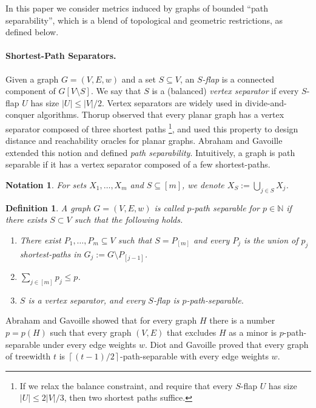 \documentclass[11pt,fleqn]{article}
\newtheorem{definition}[theorem]{Definition}
\newtheorem{notation}[theorem]{Notation}
\providecommand{\eqdef}{:=}
\begin{document}
In this paper we consider metrics induced by graphs of bounded ``path separability'', which is a blend of topological and geometric restrictions,
as defined below.

\paragraph{Shortest-Path Separators.} 
Given a graph $G = (V,E,w)$ and a set $S \subseteq V$, an {\em $S$-flap} is a connected component of $G[V \setminus S]$. We say that $S$ is a (balanced) {\em vertex separator} if every $S$-flap $U$ has size $|U| \le |V|/2$. Vertex separators are widely used in divide-and-conquer algorithms. Thorup \cite{T04} observed that every planar graph has a vertex separator composed of three shortest paths \footnote{If we relax the balance constraint, and require that every $S$-flap $U$ has size $|U| \le 2|V|/3$, then two shortest paths suffice.}, and used this property to design distance and reachability oracles for planar graphs.
Abraham and Gavoille \cite{AG06} extended this notion and defined {\em path separability}. Intuitively, a graph is path separable if it has a vertex separator composed of a few shortest-paths.
\begin{notation}
For sets $X_1, \ldots, X_m$ and $S \subseteq [m]$, we denote $X_S \eqdef \bigcup_{j \in S}X_j$. 
\end{notation}

\begin{definition}\label{def:pathDec}\cite{AG06}
A graph $G=(V,E,w)$ is called {\em $p$-path separable} for $p \in \mathbb{N}$ if there exists $S \subset V$ 
such that the following holds.
\begin{enumerate}
	\item There exist $P_1,\ldots,P_m \subseteq V$ such that $S = P_{[m]}$ and every $P_j$ is the union of $p_j$ shortest-paths in $G_j \eqdef G \setminus P_{[j-1]}$.
	\item $\sum_{j \in [m]}p_j \le p$.
	\item $S$ is a vertex separator, and every $S$-flap is $p$-path-separable.
\end{enumerate}
\end{definition}
Abraham and Gavoille showed that for every graph $H$ there is a number $p = p(H)$ such that every graph $(V,E)$ that excludes $H$ as a minor is $p$-path-separable under every edge weights $w$.
Diot and Gavoille \cite{DG10} proved that every graph of treewidth $t$ is $\left\lceil (t-1)/2 \right\rceil$-path-separable with every edge weights $w$.
\end{document}
